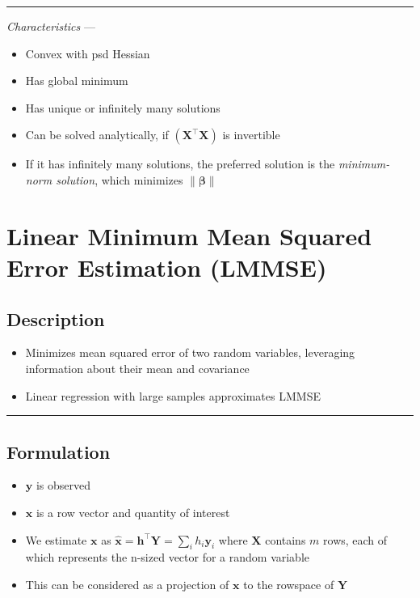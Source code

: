 {\color{lightgray}\hrule height 0.001mm}

\emph{Characteristics} --- 
\begin{itemize}
    \item Convex with psd Hessian
    \item Has global minimum
    \item Has unique or infinitely many solutions
    \item Can be solved analytically, if $(\boldsymbol{X}^\intercal \boldsymbol{X})$ is invertible
    \item If it has infinitely many solutions, the preferred solution is the \emph{minimum-norm solution}, which minimizes $\| \boldsymbol{\beta} \|$
\end{itemize}

\section{Linear Minimum Mean Squared Error Estimation (LMMSE)}
\subsection*{Description}
\begin{itemize}
    \item Minimizes mean squared error of two random variables, leveraging information about their mean and covariance 
    \item Linear regression with large samples approximates LMMSE 
\end{itemize}

{\color{black}\hrule height 0.001mm}

\subsection*{Formulation}

\begin{itemize}
    \item $\boldsymbol{y}$ is observed
    \item $\boldsymbol{x}$ is a row vector and quantity of interest
    \item We estimate $\boldsymbol{x}$ as $\hat{\boldsymbol{x}} = \boldsymbol{h}^\intercal \boldsymbol{Y} = \sum_i h_i \boldsymbol{y}_i$ where $\boldsymbol{X}$ contains $m$ rows, each of which represents the n-sized vector for a random variable
    \item This can be considered as a projection of $\boldsymbol{x}$ to the rowspace of $\boldsymbol{Y}$
\end{itemize}

